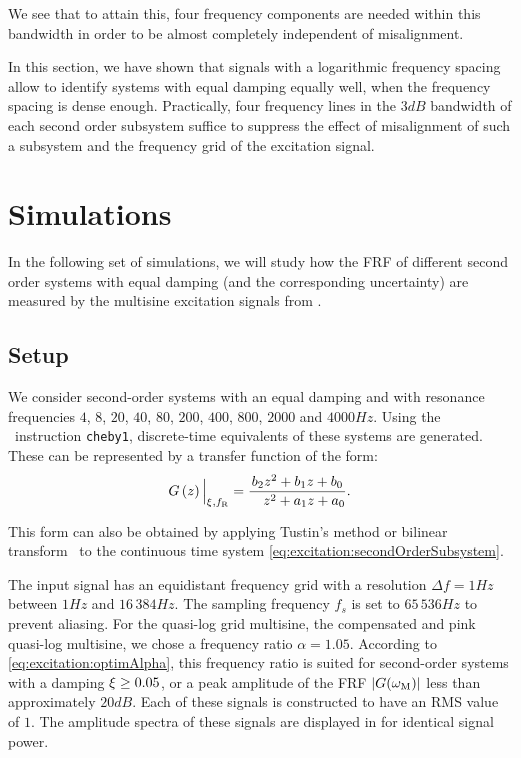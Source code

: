   We see that to attain this, four frequency components are needed within this bandwidth in order to be almost completely independent of misalignment.

  In this section, we have shown that signals with a logarithmic frequency spacing allow to identify systems with equal damping equally well, when the frequency spacing is dense enough.
  Practically, four frequency lines in the $3\unit{dB}$ bandwidth of each second order subsystem suffice to suppress the effect of misalignment of such a subsystem and the frequency grid of the excitation signal.
  
\section{Simulations} \label{sec:excitation:simulation}
In the following set of simulations, we will study how the \gls{FRF} of different second order systems with equal damping (and the corresponding uncertainty) are measured by the multisine excitation signals from .
  \subsection{Setup}
  We consider second-order systems with an equal damping and with resonance frequencies $4$, $8$, $20$, $40$, $80$, $200$, $400$, $800$, $2000$ and $4000 \unit{Hz}$.
  Using the \matlab\ instruction \texttt{cheby1}, discrete-time equivalents of these systems are generated.
  These can be represented by a transfer function of the form:
  \begin{equation}
    G \left( z \right)\Big|_{\damping, \fR} =
       \frac{         b_2  z^{2} + b_1 z + b_0}%
            {\phantom{a_2} z^{2} + a_1 z + a_0}
  \text{.}
  \label{eq:excitation:secondOrderSystemDTidentifiable}
  \end{equation}

  This form can also be obtained by applying Tustin's method or bilinear transform~\citep{Oppenheim1983} to the continuous time system \eqref{eq:excitation:secondOrderSubsystem}.

  The input signal has an equidistant frequency grid with a resolution $\Delta f = 1\unit{Hz}$ between $1 \unit{Hz}$ and $16\,384\unit{Hz}$.
  The sampling frequency $f_s$ is set to $65\,536\unit{Hz}$ to prevent aliasing.
  For the quasi-log grid multisine, the compensated and pink quasi-log multisine, we chose a frequency ratio $\alpha = 1.05$.
  According to \eqref{eq:excitation:optimAlpha}, this frequency ratio is suited for second-order systems with a damping $\xi_{} \geq 0.05$, or a peak amplitude of the \gls{FRF} $\left| G(\omega_{\mathrm{M}}) \right|$ less than approximately $20\unit{dB}$.
  Each of these signals is constructed to have an \gls{RMS} value of $1$.
  The amplitude spectra of these signals are displayed in  for identical signal power.

